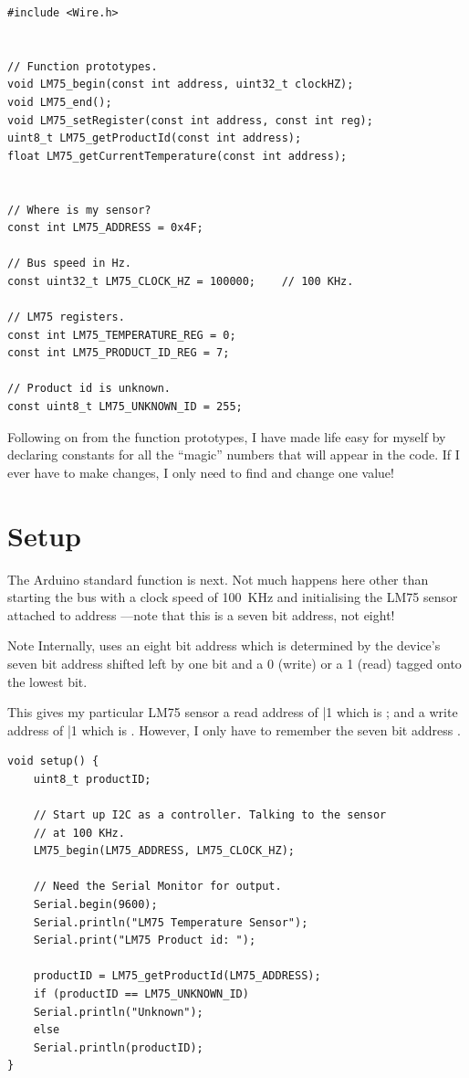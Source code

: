 \begin{lstlisting}[caption={BareBones.ino - Prologue.},label={lst: BareBones.ino - Prologue}, style=myArduino, firstnumber=15]
#include <Wire.h>


// Function prototypes.
void LM75_begin(const int address, uint32_t clockHZ);
void LM75_end();
void LM75_setRegister(const int address, const int reg);
uint8_t LM75_getProductId(const int address);
float LM75_getCurrentTemperature(const int address);


// Where is my sensor?
const int LM75_ADDRESS = 0x4F;

// Bus speed in Hz.
const uint32_t LM75_CLOCK_HZ = 100000;    // 100 KHz.

// LM75 registers.
const int LM75_TEMPERATURE_REG = 0;
const int LM75_PRODUCT_ID_REG = 7;

// Product id is unknown.
const uint8_t LM75_UNKNOWN_ID = 255;
\end{lstlisting}

Following on from the function prototypes, I have made life easy for myself by declaring constants for all the ``magic'' numbers that will appear in the code. If I ever have to make changes, I only need to find and change one value!



\section{Setup}

The Arduino standard  function is next. Not much happens here other than starting the \twi{} bus with a clock speed of 100~KHz and initialising the LM75 sensor attached to address ---note that this is a seven bit address, not eight!

\eject\begin{tips}{Note}
    Internally, \twi{} uses an eight bit address which is determined by the device's seven bit address shifted left by one bit and a 0 (write) or a 1 (read) tagged onto the lowest bit.

    This gives my particular LM75 sensor a read address of  |1 which is ; and a write address of  |1 which is . However, I only have to remember the seven bit address .
\end{tips}


\begin{lstlisting}[caption={BareBones.ino - Setup.},label={lst: BareBones.ino - Setup}, style=myArduino, firstnumber=43]
void setup() {
    uint8_t productID;

    // Start up I2C as a controller. Talking to the sensor
    // at 100 KHz.
    LM75_begin(LM75_ADDRESS, LM75_CLOCK_HZ);

    // Need the Serial Monitor for output.
    Serial.begin(9600);
    Serial.println("LM75 Temperature Sensor");
    Serial.print("LM75 Product id: ");

    productID = LM75_getProductId(LM75_ADDRESS);
    if (productID == LM75_UNKNOWN_ID)
    Serial.println("Unknown");
    else
    Serial.println(productID);
}
\end{lstlisting}

